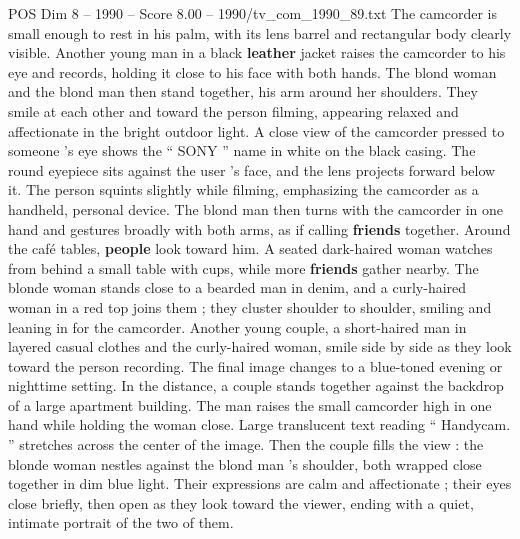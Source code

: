 \begin{textsample}{POS Dim 8 – 1990 – Score 8.00 – 1990/tv\_com\_1990\_89.txt}
The camcorder is small enough to rest in his palm, with its lens barrel and rectangular body clearly visible.
Another young man in a black \textbf{leather} jacket raises the camcorder to his eye and records, holding it close to his face with both hands.
The blond woman and the blond man then stand together, his arm around her shoulders.
They smile at each other and toward the person filming, appearing relaxed and affectionate in the bright outdoor light.
A close view of the camcorder pressed to someone ’s eye shows the “ SONY ” name in white on the black casing.
The round eyepiece sits against the user ’s face, and the lens projects forward below it.
The person squints slightly while filming, emphasizing the camcorder as a handheld, personal device.
The blond man then turns with the camcorder in one hand and gestures broadly with both arms, as if calling \textbf{friends} together.
Around the café tables, \textbf{people} look toward him.
A seated dark-haired woman watches from behind a small table with cups, while more \textbf{friends} gather nearby.
The blonde woman stands close to a bearded man in denim, and a curly-haired woman in a red top joins them ; they cluster shoulder to shoulder, smiling and leaning in for the camcorder.
Another young couple, a short-haired man in layered casual clothes and the curly-haired woman, smile side by side as they look toward the person recording.
The final image changes to a blue-toned evening or nighttime setting.
In the distance, a couple stands together against the backdrop of a large apartment building.
The man raises the small camcorder high in one hand while holding the woman close.
Large translucent text reading “ Handycam. ” stretches across the center of the image.
Then the couple fills the view : the blonde woman nestles against the blond man ’s shoulder, both wrapped close together in dim blue light.
Their expressions are calm and affectionate ; their eyes close briefly, then open as they look toward the viewer, ending with a quiet, intimate portrait of the two of them.

\end{textsample}
